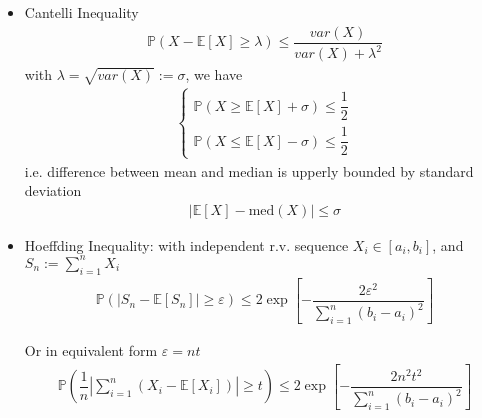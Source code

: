 \begin{itemize}
\begin{itemize}[topsep=2pt,itemsep=0pt]
    \end{itemize}
    \item Cantelli Inequality
    \begin{align}
        \mathbb{P}\left( X-\mathbb{E}\left[ X \right] \geq \lambda  \right) \leq \dfrac{var(X)}{var(X)+\lambda ^2} 
    \end{align}
    with $ \lambda =\sqrt{var(X)}:=\sigma  $, we have
    \begin{align}
        \begin{cases}
            \mathbb{P}\left( X\geq \mathbb{E}\left[ X \right] + \sigma \right) \leq \dfrac{1}{2}\\
            \mathbb{P}\left( X\leq \mathbb{E}\left[ X \right] - \sigma \right) \leq \dfrac{1}{2}
        \end{cases}
    \end{align}
    i.e. difference between mean and median is upperly bounded by standard deviation
    \begin{align}
        |\mathbb{E}\left[ X \right] - \mathrm{med}(X ) |\leq \sigma  
    \end{align}
    \item Hoeffding Inequality: with independent r.v. sequence $ X_i\in [a_i,b_i] $, and $ S_n:=\sum_{i=1}^nX_i $
    \begin{align}
        \mathbb{P}\left( \left\vert S_n-\mathbb{E}\left[ S_n \right]  \right\vert \geq \varepsilon   \right)  \leq 2\exp\left[ -\dfrac{2\varepsilon ^2}{\sum_{i=1}^n (b_i-a_i)^2} \right]
    \end{align}

    Or in equivalent form $ \varepsilon =nt $
    \begin{align}
        \mathbb{P}\left( \dfrac{1}{n}\left\vert \sum_{i=1}^n\left(X_i-\mathbb{E}\left[ X_i \right] \right) \right\vert \geq t   \right)  \leq 2\exp\left[ -\dfrac{2n^2t ^2}{\sum_{i=1}^n (b_i-a_i)^2} \right]
    \end{align}
    

\end{itemize}
